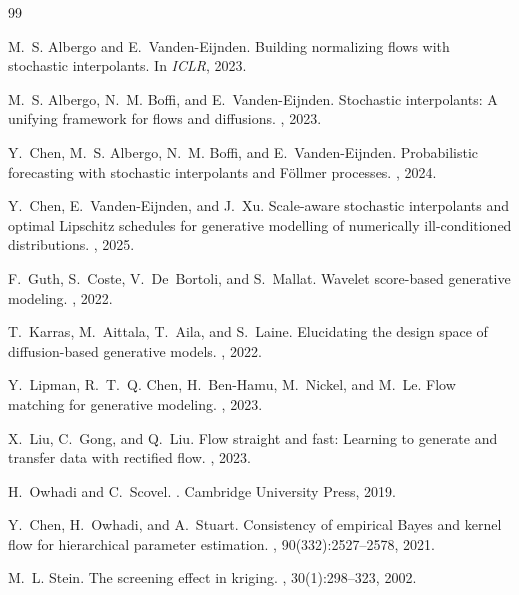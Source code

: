 \documentclass[11pt]{amsart}
\theoremstyle{remark}
\numberwithin{equation}{section}
\begin{document}

\begin{thebibliography}{99}

M.~S. Albergo and E.~Vanden-Eijnden.
\newblock Building normalizing flows with stochastic interpolants.
\newblock In {\em ICLR}, 2023.

M.~S. Albergo, N.~M. Boffi, and E.~Vanden-Eijnden.
\newblock Stochastic interpolants: A unifying framework for flows and
  diffusions.
, 2023.

Y.~Chen, M.~S. Albergo, N.~M. Boffi, and E.~Vanden-Eijnden.
\newblock Probabilistic forecasting with stochastic interpolants and
  F{\"o}llmer processes.
, 2024.

Y.~Chen, E.~Vanden-Eijnden, and J.~Xu.
\newblock Scale-aware stochastic interpolants and optimal Lipschitz schedules
  for generative modelling of numerically ill-conditioned distributions.
, 2025.

F.~Guth, S.~Coste, V.~De~Bortoli, and S.~Mallat.
\newblock Wavelet score-based generative modeling.
, 2022.

T.~Karras, M.~Aittala, T.~Aila, and S.~Laine.
\newblock Elucidating the design space of diffusion-based generative models.
, 2022.

Y.~Lipman, R.~T.~Q. Chen, H.~Ben-Hamu, M.~Nickel, and M.~Le.
\newblock Flow matching for generative modeling.
, 2023.

X.~Liu, C.~Gong, and Q.~Liu.
\newblock Flow straight and fast: Learning to generate and transfer data with
  rectified flow.
, 2023.

H.~Owhadi and C.~Scovel.
.
\newblock Cambridge University Press, 2019.

Y.~Chen, H.~Owhadi, and A.~Stuart.
\newblock Consistency of empirical {B}ayes and kernel flow for hierarchical
  parameter estimation.
, 90(332):2527--2578, 2021.

M.~L. Stein.
\newblock The screening effect in kriging.
, 30(1):298--323, 2002.


\end{thebibliography}
\end{document}
